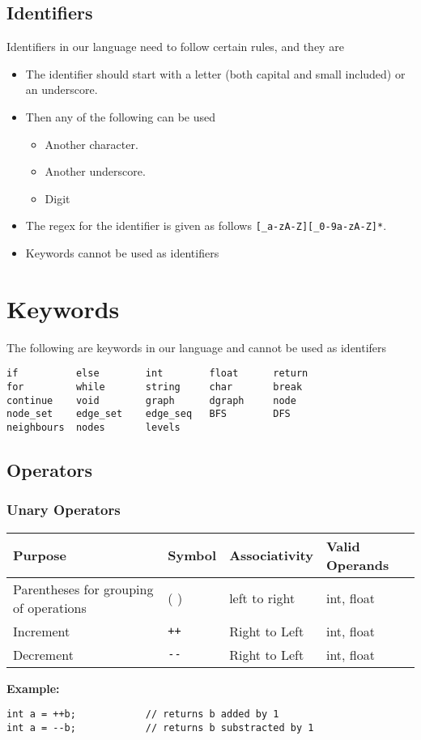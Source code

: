 \documentclass[english,a4paper,12pt]{report}
\begin{document}
\subsection{Identifiers}
Identifiers in our language need to follow certain rules, and they are 
\begin{itemize}
    \item The identifier should start with a letter (both capital and small included) or an underscore.
    \item Then any of the following can be used 
    \begin{itemize}
        \item Another character.
        \item Another underscore.
        \item Digit
    \end{itemize}
    \item The regex for the identifier is given as follows \verb|[_a-zA-Z][_0-9a-zA-Z]*|.
    \item Keywords cannot be used as identifiers 
\end{itemize}
\section{Keywords}
The following are keywords in our language and cannot be used as identifers
\begin{lstlisting}[style=CStyle]
if          else        int        float      return 
for         while       string     char       break
continue    void        graph      dgraph     node
node_set    edge_set    edge_seq   BFS        DFS
neighbours  nodes       levels          
\end{lstlisting}
\subsection{Operators}
\subsubsection{Unary Operators}
\begin{center}
\renewcommand{\arraystretch}{1.5}%
\begin{tabular}{ |m{10em}|m{10em}|m{10em}|m{10em}| } 
\hline
Purpose & Symbol & Associativity & Valid Operands \\
\hline
Parentheses for grouping of operations & ( ) & left to right & int, float \\
\hline
Increment & \verb|++| & Right to Left & int, float \\
\hline
Decrement & \verb|--| & Right to Left & int, float \\
\hline
\end{tabular}
\end{center}
\textbf{Example:}
\begin{lstlisting}[style=CStyle]
int a = ++b;            // returns b added by 1
int a = --b;            // returns b substracted by 1
\end{lstlisting}
\end{document}
